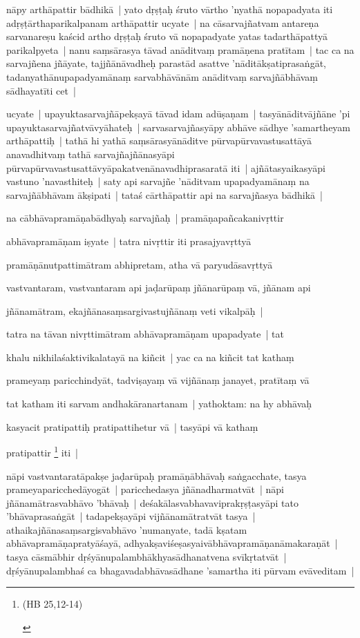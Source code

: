 \documentclass[article,12pt,a4paper]{memoir}
\begin{document}
	  \pstart nāpy arthāpattir bādhikā | yato dṛṣṭaḥ śruto vārtho 'nyathā nopapadyata iti adṛṣṭārthaparikalpanam arthāpattir ucyate | na cāsarvajñatvam antareṇa sarvanareṣu kaścid artho dṛṣṭaḥ śruto vā nopapadyate yatas tadarthāpattyā parikalpyeta | nanu saṃsārasya tāvad anāditvaṃ pramāṇena pratītam | tac ca na sarvajñena jñāyate, tajjñānāvadheḥ parastād asattve 'nāditākṣatiprasaṅgāt, tadanyathānupapadyamānaṃ sarvabhāvānām anāditvaṃ sarvajñābhāvaṃ sādhayatīti cet | 
	\pend
      

	  \pstart ucyate | upayuktasarvajñāpekṣayā tāvad idam adūṣaṇam | tasyānāditvājñāne 'pi upayuktasarvajñatvāvyāhateḥ | sarvasarvajñasyāpy abhāve sādhye 'samartheyam arthāpattiḥ | tathā hi yathā saṃsārasyānāditve pūrvapūrvavastusattāyā anavadhitvaṃ tathā sarvajñajñānasyāpi pūrvapūrvavastusattāvyāpakatvenānavadhiprasaratā iti | ajñātasyaikasyāpi vastuno 'navasthiteḥ | saty api sarvajñe 'nāditvam upapadyamānaṃ na sarvajñābhāvam ākṣipati | tataś cārthāpattir api na sarvajñasya bādhikā | 
	\pend
      

	  \pstart na cābhāvapramāṇabādhyaḥ sarvajñaḥ | pramāṇapañcakanivṛttir 
	\pend
      

	  \pstart abhāvapramāṇam iṣyate | tatra nivṛttir iti prasajyavṛttyā 
	\pend
      

	  \pstart pramāṇānutpattimātram abhipretam, atha vā paryudāsavṛttyā 
	\pend
      

	  \pstart vastvantaram, vastvantaram api jaḍarūpaṃ jñānarūpaṃ vā, jñānam api 
	\pend
      

	  \pstart jñānamātram, ekajñānasaṃsargivastujñānaṃ veti vikalpāḥ | 
	\pend
      

	  \pstart tatra na tāvan nivṛttimātram abhāvapramāṇam upapadyate | tat 
	\pend
      

	  \pstart khalu nikhilaśaktivikalatayā na kiñcit | yac ca na kiñcit tat kathaṃ 
	\pend
      

	  \pstart prameyaṃ paricchindyāt, tadviṣayaṃ vā vijñānaṃ janayet, pratītaṃ vā 
	\pend
      

	  \pstart tat katham iti sarvam andhakāranartanam | yathoktam: na hy abhāvaḥ 
	\pend
      

	  \pstart kasyacit pratipattiḥ pratipattihetur vā | tasyāpi vā kathaṃ 
	\pend
      

	  \pstart pratipattir \footnote{\begin{english}(HB 25,12-14)\end{english}} iti |
	\pend
      

	  \pstart nāpi vastvantaratāpakṣe jaḍarūpaḥ pramāṇābhāvaḥ saṅgacchate, tasya prameyaparicchedāyogāt | paricchedasya jñānadharmatvāt | nāpi jñānamātrasvabhāvo 'bhāvaḥ | deśakālasvabhavaviprakṛṣṭasyāpi tato 'bhāvaprasaṅgāt | tadapekṣayāpi vijñānamātratvāt tasya | athaikajñānasaṃsargisvabhāvo 'numanyate, tadā kṣatam abhāvapramāṇapratyāśayā, adhyakṣaviśeṣasyaivābhāvapramāṇanāmakaraṇāt | tasya cāsmābhir dṛśyānupalambhākhyasādhanatvena svīkṛtatvāt | dṛśyānupalambhaś ca bhagavadabhāvasādhane 'samartha iti pūrvam evāveditam | 
	\pend
      
\end{document}
